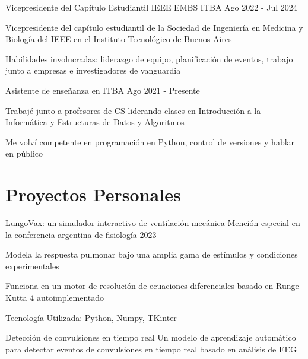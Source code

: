     \resumeSubheading
    { Vicepresidente del Capítulo Estudiantil IEEE EMBS ITBA }{}
      {}{Ago 2022 - Jul 2024}
      \vspace{-5mm}
      \resumeItemListStart
    \item {Vicepresidente del capítulo estudiantil de la Sociedad de Ingeniería en Medicina y Biología del IEEE en el Instituto Tecnológico de Buenos Aires}
    \item {Habilidades involucradas: liderazgo de equipo, planificación de eventos, trabajo junto a empresas e investigadores de vanguardia}
    \resumeItemListEnd


    \resumeSubheading
      {Asistente de enseñanza en ITBA}{}
      {}{Ago 2021 - Presente}
      \resumeItemListStart
      \vspace{-5mm}
    \item {Trabajé junto a profesores de CS liderando clases en Introducción a la Informática y Estructuras de Datos y Algoritmos}
    \item {Me volví competente en programación en Python, control de versiones y hablar en público}
    \resumeItemListEnd
  \resumeSubHeadingListEnd

\vspace{-5.0mm}
\section{\textbf{Proyectos Personales}}
\resumeSubHeadingListStart
    \resumeProject
      {LungoVax: un simulador interactivo de ventilación mecánica} %
      {Mención especial en la conferencia argentina de fisiología 2023} %
      {} %

      \resumeItemListStart
        \item {Modela la respuesta pulmonar bajo una amplia gama de estímulos y condiciones experimentales}
        \item {Funciona en un motor de resolución de ecuaciones diferenciales basado en Runge-Kutta 4 autoimplementado}
        \item {Tecnología Utilizada: Python, Numpy, TKinter}
    \resumeItemListEnd
    \vspace{0.5mm}

    \resumeProject
      {Detección de convulsiones en tiempo real} %
      {Un modelo de aprendizaje automático para detectar eventos de convulsiones en tiempo real basado en análisis de EEG} %
      {} %

